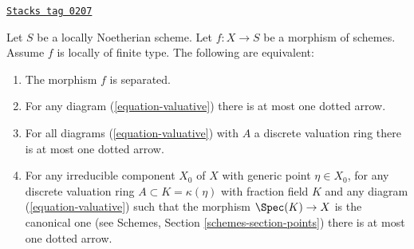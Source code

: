 \begin{lemma}
\label{limits-lemma-Noetherian-dvr-valuative-separation}
\href{https://stacks.math.columbia.edu/tag/0207}{\texttt{Stacks tag 0207}}

Let $S$ be a locally Noetherian scheme.
Let $f : X \to S$ be a morphism of schemes.
Assume $f$ is locally of finite type.
The following are equivalent:
\begin{enumerate}
\item The morphism $f$ is separated.
\item For any diagram (\ref{equation-valuative}) there is at most
one dotted arrow.
\item For all diagrams (\ref{equation-valuative}) with $A$ a discrete
valuation ring there is at most one dotted arrow.
\item For any irreducible component $X_0$ of $X$ with
generic point $\eta \in X_0$, for any discrete valuation ring
$A \subset K = \kappa(\eta)$ with fraction field $K$ and any
diagram (\ref{equation-valuative}) such that
the morphism $\Spec(K) \to X$ is the canonical one
(see Schemes, Section \ref{schemes-section-points})
there is at most one dotted arrow.
\end{enumerate}
\end{lemma}

